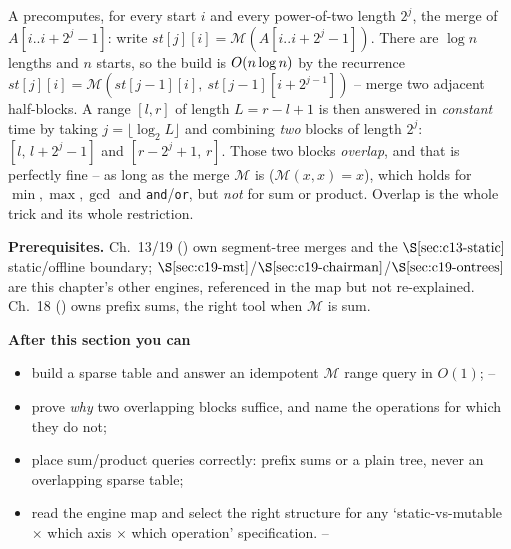 \begin{topicintro}
A  precomputes, for every start \(i\) and every power-of-two length \(2^j\), the merge of \(A[i..i+2^j-1]\): write \(\mathit{st}[j][i]=\mathcal{M}(A[i..i+2^j-1])\). There are \(\log n\) lengths and \(n\) starts, so the build is \(O(n\log n)\) by the recurrence \(\mathit{st}[j][i]=\mathcal{M}(\mathit{st}[j-1][i],\ \mathit{st}[j-1][i+2^{j-1}])\) -- merge two adjacent half-blocks. A range \([l,r]\) of length \(L=r-l+1\) is then answered in \emph{constant} time by taking \(j=\lfloor\log_2 L\rfloor\) and combining \emph{two} blocks of length \(2^j\): \([l,\,l+2^j-1]\) and \([r-2^j+1,\,r]\). Those two blocks \emph{overlap}, and that is perfectly fine -- as long as the merge \(\mathcal{M}\) is  (\(\mathcal{M}(x,x)=x\)), which holds for \(\min,\max,\gcd\) and \texttt{and}/\texttt{or}, but \emph{not} for sum or product. Overlap is the whole trick and its whole restriction.

\textbf{Prerequisites.} Ch.~13/19 () own segment-tree merges and the \(\secref{c13-static}\) static/offline boundary; \(\secref{c19-mst}\)/\(\secref{c19-chairman}\)/\(\secref{c19-ontrees}\) are this chapter's other engines, referenced in the map but not re-explained. Ch.~18 () owns prefix sums, the right tool when \(\mathcal{M}\) is sum.

\textbf{After this section you can}
\begin{itemize}[nosep]
  \item build a sparse table and answer an idempotent \(\mathcal{M}\) range query in \(O(1)\); \hfill{}--
  \item prove \emph{why} two overlapping blocks suffice, and name the operations for which they do not; \hfill{}
  \item place sum/product queries correctly: prefix sums or a plain tree, never an overlapping sparse table; \hfill{}
  \item read the engine map and select the right structure for any `static-vs-mutable \(\times\) which axis \(\times\) which operation' specification. \hfill{}--
\end{itemize}
\end{topicintro}

